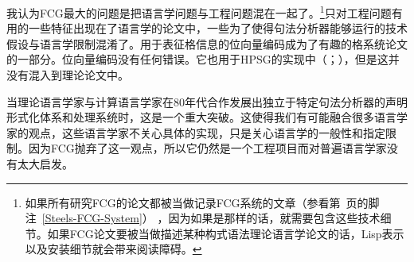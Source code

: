 我认为FCG最大的问题是把语言学问题与工程问题混在一起了。\footnote{%
如果所有研究FCG的论文都被当做记录FCG系统的文章（参看第~\pageref{Steels-FCG-System}页的脚注~\ref{Steels-FCG-System}） ，因为如果是那样的话，就需要包含这些技术细节。如果FCG论文要被当做描述某种构式语法理论语言学论文的话，Lisp表示以及安装细节就会带来阅读障碍。
}只对工程问题有用的一些特征出现在了语言学的论文中，一些为了使得句法分析器能够运行的技术假设与语言学限制混淆了。用于表征格信息的位向量编码成为了有趣的格系统论文的一部分。位向量编码没有任何错误。它也用于HPSG的实现中（\citealp[]{Reape91}；\citealp[]{Babel}），但是这并没有混入到理论论文中。

当理论语言学家与计算语言学家在80年代合作发展出独立于特定句法分析器的声明形式化体系和处理系统时，这是一个重大突破。这使得我们有可能融合很多语言学家的观点，这些语言学家不关心具体的实现，只是关心语言学的一般性和指定限制。因为FCG抛弃了这一观点，所以它仍然是一个工程项目而对普遍语言学家没有太大启发。
\indexhpsgend\indexsbcgend

